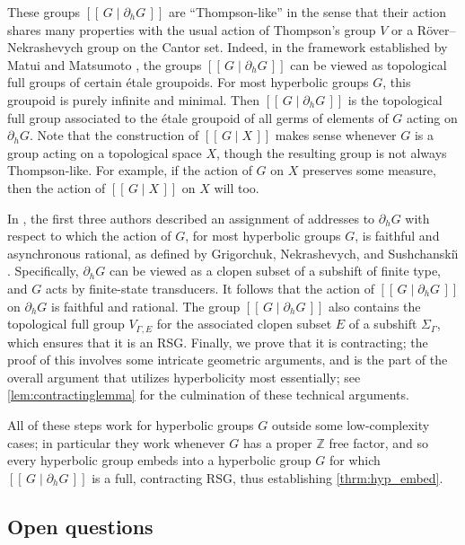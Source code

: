 \documentclass[11pt,letterpaper]{amsart}
\theoremstyle{definition}
\newcommand{\Z}{\mathbb{Z}}
\begin{document}
These groups $[[\,G\mid \partial_h G\,]]$ are ``Thompson-like'' in the sense that their action shares many properties with the usual action of Thompson's group $V$ or a R\"over--Nekrashevych group on the Cantor set. Indeed, in the framework established by Matui and Matsumoto \cite{Matui12,Matui13,MatuiMatsumoto14,Matsumoto15,Matui15,MatuiMatsumoto17}, the groups $[[\,G\mid \partial_h G\,]]$ can be viewed as topological full groups of certain \'etale groupoids.  For most hyperbolic groups $G$, this groupoid is purely infinite and minimal.  Then $[[\,G\mid \partial_h G\,]]$ is the topological full group associated to the \'etale groupoid of all germs of elements of $G$ acting on $\partial_h G$. Note that the construction of $[[\,G\mid X\,]]$ makes sense whenever $G$ is a group acting on a topological space $X$, though the resulting group is not always Thompson-like.  For example, if the action of $G$ on $X$ preserves some measure, then the action of $[[\,G\mid X\,]]$ on $X$ will too.

In \cite{BelkBleakMatucci}, the first three authors described an assignment of addresses to $\partial_h G$ with respect to which the action of $G$, for most hyperbolic groups $G$, is faithful and asynchronous rational, as defined by Grigorchuk, Nekrashevych, and Sushchanski\u{\i} \cite{GNS}.  Specifically, $\partial_h G$ can be viewed as a clopen subset of a subshift of finite type, and $G$ acts by finite-state transducers. It follows that the action of $[[\,G\mid \partial_h G\,]]$ on $\partial_h G$ is faithful and rational. The group $[[\,G\mid \partial_h G\,]]$ also contains the topological full group $V_{\Gamma,E}$  for the associated clopen subset $E$ of a subshift $\Sigma_\Gamma$, which ensures that it is an RSG. Finally, we prove that it is contracting; the proof of this involves some intricate geometric arguments, and is the part of the overall argument that utilizes hyperbolicity most essentially; see \cref{lem:contractinglemma} for the culmination of these technical arguments.

All of these steps work for hyperbolic groups $G$ outside some low-complexity cases; in particular they work whenever $G$ has a proper $\Z$ free factor, and so every hyperbolic group embeds into a hyperbolic group $G$ for which $[[\,G\mid \partial_h G\,]]$ is a full, contracting RSG, thus establishing \cref{thrm:hyp_embed}.


\subsection{Open questions}\label{ssec:open}
\end{document}
